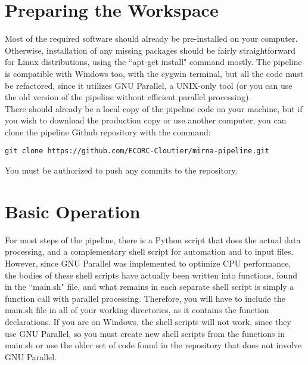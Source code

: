 \documentclass[12pt,titlepage]{article}
\begin{document}
\section*{Preparing the Workspace}
Most of the required software should already be pre-installed on your computer. Otherwise, installation of any missing packages should be fairly straightforward for Linux distributions, using the ``apt-get install" command mostly. The pipeline is compatible with Windows too, with the cygwin terminal, but all the code must be refactored, since it utilizes GNU Parallel, a UNIX-only tool (or you can use the old version of the pipeline without efficient parallel processing).\\

There should already be a local copy of the pipeline code on your machine, but if you wish to download the production copy or use another computer, you can clone the pipeline Github repository with the command:

\begin{tcolorbox}
\begin{lstlisting}
git clone https://github.com/ECORC-Cloutier/mirna-pipeline.git 
\end{lstlisting}
\end{tcolorbox}

\noindent You must be authorized to push any commits to the repository.

\section*{Basic Operation}
For most steps of the pipeline, there is a Python script that does the actual data processing, and a complementary shell script for automation and to input files. However, since GNU Parallel was implemented to optimize CPU performance, the bodies of these shell scripts have actually been written into functions, found in the ``main.sh" file, and what remains in each separate shell script is simply a function call with parallel processing. Therefore, you will have to include the main.sh file in all of your working directories, as it contains the function declarations. If you are on Windows, the shell scripts will not work, since they use GNU Parallel, so you must create new shell scripts from the functions in main.sh or use the older set of code found in the repository that does not involve GNU Parallel.\\
\end{document}
